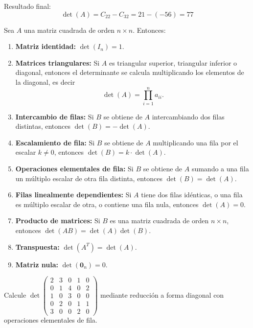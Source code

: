 \begin{example}
\begin{myproof}
Resultado final: 
\[
\det(A) = C_{22} - C_{32} = 21 - (-56) = \boxed{77}
\]
\end{myproof}
\end{example}


\begin{theorem}\label{thm:det-prop}
Sea $A$ una matriz cuadrada de orden $n \times n$. Entonces:

\begin{enumerate}
    \item \textbf{Matriz identidad:} $\det(I_n) = 1$.
    
    \item \textbf{Matrices triangulares:} Si $A$ es triangular superior, triangular inferior o diagonal, entonces el determinante se calcula multiplicando los elementos de la diagonal, es decir
    \[
    \det(A) = \prod_{i=1}^n a_{ii}.
    \]
    
    \item \textbf{Intercambio de filas:} Si $B$ se obtiene de $A$ intercambiando dos filas distintas, entonces $\det(B) = -\det(A)$.
    
    \item \textbf{Escalamiento de fila:} Si $B$ se obtiene de $A$ multiplicando una fila por el escalar $k \neq 0$, entonces $\det(B) = k \cdot \det(A)$.
    
    \item \textbf{Operaciones elementales de fila:} Si $B$ se obtiene de $A$ sumando a una fila un múltiplo escalar de otra fila distinta, entonces $\det(B) = \det(A)$.
    
    \item \textbf{Filas linealmente dependientes:} Si $A$ tiene dos filas idénticas, o una fila es múltiplo escalar de otra, o contiene una fila nula, entonces $\det(A) = 0$.
    
    \item \textbf{Producto de matrices:} Si $B$ es una matriz cuadrada de orden $n \times n$, entonces $\det(AB) = \det(A)\det(B)$.
    
    \item \textbf{Transpuesta:} $\det(A^T) = \det(A)$.
    
    \item \textbf{Matriz nula:} $\det(\mathbf{0}_n) = 0$.
\end{enumerate}
\end{theorem}

\begin{prob} 
Calcule \(\det \begin{pmatrix} 2 & 3 & 0 & 1 & 0 \\ 0 & 1 & 4 & 0 & 2 \\ 1 & 0 & 3 & 0 & 0 \\ 0 & 2 & 0 & 1 & 1 \\ 3 & 0 & 0 & 2 & 0 \end{pmatrix}\) mediante reducción a forma diagonal con operaciones elementales de fila.
\end{prob}


